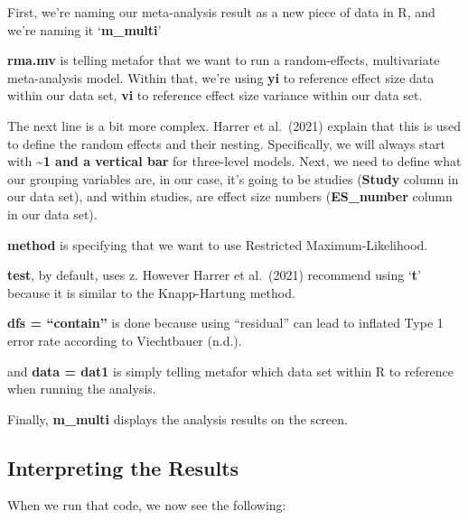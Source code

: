 \documentclass[
]{book}
\begin{document}
First, we're naming our meta-analysis result as a new piece of data in R, and we're naming it `\textbf{m\_multi}'

\textbf{rma.mv} is telling metafor that we want to run a random-effects, multivariate meta-analysis model. Within that, we're using \textbf{yi} to reference effect size data within our data set, \textbf{vi} to reference effect size variance within our data set.

The next line is a bit more complex. Harrer et al.~(2021)\citep{harrer2021} explain that this is used to define the random effects and their nesting. Specifically, we will always start with \textbf{\textasciitilde1 and a vertical bar} for three-level models. Next, we need to define what our grouping variables are, in our case, it's going to be studies (\textbf{Study} column in our data set), and within studies, are effect size numbers (\textbf{ES\_number} column in our data set).

\textbf{method} is specifying that we want to use Restricted Maximum-Likelihood.

\textbf{test}, by default, uses z. However Harrer et al.~(2021)\citep{harrer2021} recommend using `\textbf{t}' because it is similar to the Knapp-Hartung method.

\textbf{dfs = ``contain''} is done because using ``residual'' can lead to inflated Type 1 error rate according to Viechtbauer (n.d.)\citep{viechtbauer}.

and \textbf{data = dat1} is simply telling metafor which data set within R to reference when running the analysis.

Finally, \textbf{m\_multi} displays the analysis results on the screen.

\hypertarget{interpreting-the-results-1}{%
\subsection{Interpreting the Results}\label{interpreting-the-results-1}}

When we run that code, we now see the following:
\end{document}
